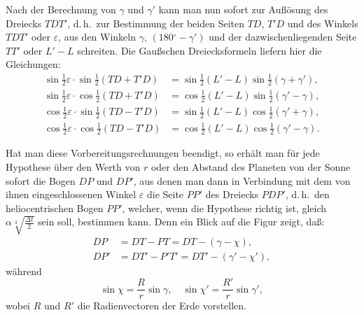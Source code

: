 \documentclass[12pt,a4paper]{article}
\newcommand{\degree}{\ensuremath{^\circ}}
\theoremstyle{plain}
\theoremstyle{definition}
\theoremstyle{remark}
\begin{document}
Nach der Berechnung von $\gamma$ und $\gamma'$ kann man nun sofort zur Auflösung des Dreiecks $TDT'$, d.\,h.\ zur Bestimmung der beiden Seiten $TD$, $T'D$ und des Winkels $TDT'$ oder $\varepsilon$, aus den Winkeln $\gamma$, $(180\degree - \gamma')$ und der dazwischenliegenden Seite $TT'$ oder $L' - L$ schreiten. Die Gaußschen Dreiecksformeln liefern hier die Gleichungen:
\begin{align}
\sin\tfrac{1}{2}\varepsilon \cdot \sin\tfrac{1}{2}(TD + T'D) &= \sin\tfrac{1}{2}(L' - L) \sin\tfrac{1}{2}(\gamma + \gamma'), \tag{5}\\
\sin\tfrac{1}{2}\varepsilon \cdot \cos\tfrac{1}{2}(TD + T'D) &= \cos\tfrac{1}{2}(L' - L) \sin\tfrac{1}{2}(\gamma' - \gamma), \tag{6}\\
\cos\tfrac{1}{2}\varepsilon \cdot \sin\tfrac{1}{2}(TD - T'D) &= \sin\tfrac{1}{2}(L' - L) \cos\tfrac{1}{2}(\gamma' + \gamma), \tag{7}\\
\cos\tfrac{1}{2}\varepsilon \cdot \cos\tfrac{1}{2}(TD - T'D) &= \cos\tfrac{1}{2}(L' - L) \cos\tfrac{1}{2}(\gamma' - \gamma). \tag{8}
\end{align}

Hat man diese Vorbereitungsrechnungen beendigt, so erhält man für jede Hypothese über den Werth von $r$ oder den Abstand des Planeten von der Sonne sofort die Bogen $DP$ und $DP'$, aus denen man dann in Verbindung mit dem von ihnen eingeschlossenen Winkel $\varepsilon$ die Seite $PP'$ des Dreiecks $PDP'$, d.\,h.\ den heliocentrischen Bogen $PP'$, welcher, wenn die Hypothese richtig ist, gleich $\alpha\sqrt[3]{\frac{\Delta t}{2}}$ sein soll, bestimmen kann. Denn ein Blick auf die Figur zeigt, daß:
\begin{align}
DP &= DT - PT = DT - (\gamma - \chi), \tag{9}\\
DP' &= DT' - P'T' = DT' - (\gamma' - \chi'), \tag{10}
\end{align}
während
\[
\sin\chi = \frac{R}{r}\sin\gamma,\quad \sin\chi' = \frac{R'}{r}\sin\gamma',
\]
wobei $R$ und $R'$ die Radienvectoren der Erde vorstellen.
\end{document}
